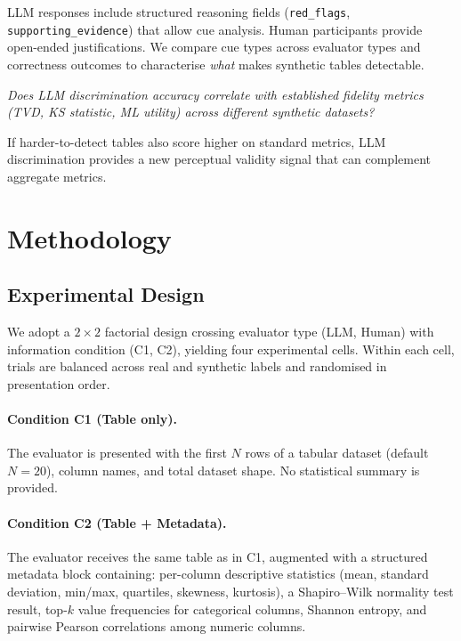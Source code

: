 \documentclass[runningheads]{llncs}
\begin{document}
\begin{description}[leftmargin=0pt,itemsep=6pt]
    LLM responses include structured reasoning fields
    (\texttt{red\_flags}, \texttt{supporting\_evidence}) that
    allow cue analysis.
    Human participants provide open-ended justifications.
    We compare cue types across evaluator types and correctness
    outcomes to characterise \emph{what} makes synthetic tables
    detectable.

  \item[\textbf{RQ5} --- Correlation with Fidelity Metrics.]
    \emph{Does LLM discrimination accuracy correlate with
    established fidelity metrics (TVD, KS statistic, ML utility)
    across different synthetic datasets?}

    If harder-to-detect tables also score higher on standard metrics,
    LLM discrimination provides a new perceptual validity signal
    that can complement aggregate metrics.

\end{description}

\section{Methodology}
\label{sec:method}

\subsection{Experimental Design}

We adopt a $2 \times 2$ factorial design crossing evaluator type
(LLM, Human) with information condition (C1, C2), yielding four
experimental cells.
Within each cell, trials are balanced across real and synthetic labels
and randomised in presentation order.

\paragraph{Condition C1 (Table only).}
The evaluator is presented with the first $N$ rows of a tabular
dataset (default $N = 20$), column names, and total dataset shape.
No statistical summary is provided.

\paragraph{Condition C2 (Table + Metadata).}
The evaluator receives the same table as in C1, augmented with a
structured metadata block containing: per-column descriptive statistics
(mean, standard deviation, min/max, quartiles, skewness, kurtosis),
a Shapiro--Wilk normality test result, top-$k$ value frequencies for
categorical columns, Shannon entropy, and pairwise Pearson correlations
among numeric columns.
\end{document}
